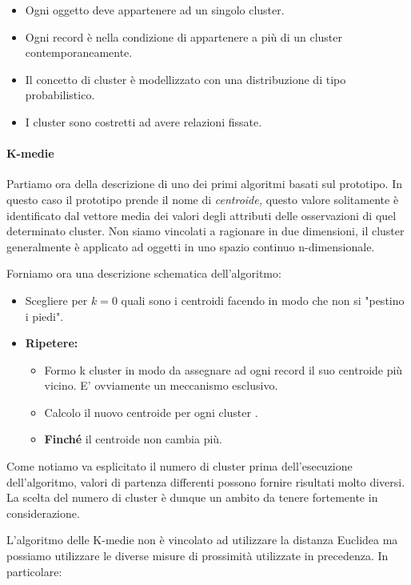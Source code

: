 \begin{itemize}
	\item Ogni oggetto deve appartenere ad un singolo cluster.
	\item Ogni record è nella condizione di appartenere a più di un cluster contemporaneamente.
	\item Il concetto di cluster è modellizzato con una distribuzione di tipo probabilistico.
	\item I cluster sono costretti ad avere relazioni fissate.
\end{itemize}

\paragraph{K-medie}

Partiamo ora della descrizione di uno dei primi algoritmi basati sul prototipo. In questo caso il prototipo prende il nome di \textit{centroide,} questo valore solitamente è identificato dal vettore media dei valori degli attributi delle osservazioni di quel determinato cluster. Non siamo vincolati a ragionare in due dimensioni, il cluster generalmente è applicato ad oggetti in uno spazio continuo n-dimensionale.

Forniamo ora una descrizione schematica dell'algoritmo:
\begin{itemize}
	\item Scegliere per $k = 0$ quali sono i centroidi facendo in modo che non si "pestino i piedi".
	\item \textbf{Ripetere:}
	\begin{itemize}
		\item Formo k cluster in modo da assegnare ad ogni record il suo centroide più vicino. E' ovviamente un meccanismo esclusivo.
		\item Calcolo il nuovo centroide per ogni cluster .
		\item \textbf{Finché} il centroide non cambia più.		 
	\end{itemize}
	
	
\end{itemize}

Come notiamo va esplicitato il numero di cluster prima dell'esecuzione dell'algoritmo,  valori di partenza differenti possono fornire risultati molto diversi. La scelta del numero di cluster è dunque un ambito da tenere fortemente in considerazione.

L'algoritmo delle K-medie non è vincolato ad utilizzare la distanza Euclidea ma possiamo utilizzare le diverse misure di prossimità utilizzate in precedenza. In particolare:

